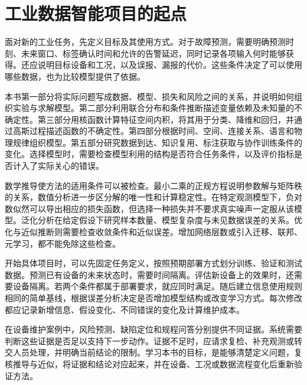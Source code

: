 \documentclass[UTF8,11pt,zihao=false,linespread=1.3,openany]{ctexbook}
\begin{document}
\backmatter
\chapter*{工业数据智能项目的起点}
面对新的工业任务，先定义目标及其使用方式。对于故障预测，需要明确预测时刻、未来窗口、标签确认时间和允许的告警延迟，同时记录各项输入何时能够获得。还应说明目标设备和工况，以及误报、漏报的代价。这些条件决定了可以使用哪些数据，也为比较模型提供了依据。

本书第一部分将实际问题写成数据、模型、损失和风险之间的关系，并说明如何组织实验与求解模型。第二部分利用联合分布和条件推断描述变量依赖及未知量的不确定性。第三部分用核函数计算特征空间内积，将其用于分类、降维和回归，并通过高斯过程描述函数的不确定性。第四部分根据时间、空间、连接关系、语言和物理规律组织模型。第五部分研究数据到达、知识复用、标注获取与协作训练条件的变化。选择模型时，需要检查模型利用的结构是否符合任务条件，以及评价指标是否计入了实际关心的错误。

数学推导使方法的适用条件可以被检查。最小二乘的正规方程说明参数解与矩阵秩的关系，数值分析进一步区分解的唯一性和计算稳定性。在特定观测模型下，负对数似然可以导出相应的损失函数，但选择一种损失并不要求真实噪声一定服从该模型。泛化分析在给定假设下研究样本数量、模型复杂度与未见数据误差的关系。优化与近似推断则需要检查收敛条件和近似误差。增加网络层数或引入迁移、联邦、元学习，都不能免除这些检查。

开始具体项目时，可以先固定任务定义，按照预期部署方式划分训练、验证和测试数据。预测已有设备的未来状态时，需要时间隔离。评估新设备上的效果时，还需要设备隔离。若两个条件都属于部署要求，就应同时满足。随后建立信息使用规则相同的简单基线，根据误差分析决定是否增加模型结构或改变学习方式。每次修改都应记录新增信息、假设变化、不同错误的变化及计算维护成本。

在设备维护案例中，风险预测、缺陷定位和规程问答分别提供不同证据。系统需要判断这些证据是否足以支持下一步动作。证据不足时，应请求复检、补充观测或转交人员处理，并明确当前结论的限制。学习本书的目标，是能够清楚定义问题，复核推导与近似，将证据和结论对应起来，并在设备、工况或数据流程变化后重新验证方法。



\end{document}

